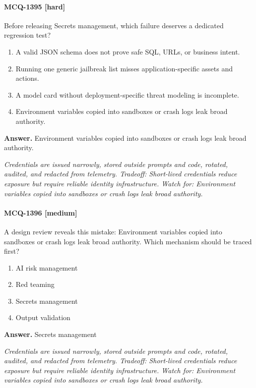 \paragraph{MCQ-1395 [hard]} Before releasing Secrets management, which failure deserves a dedicated regression test?
\begin{enumerate}[label=\Alph*.]
\item A valid JSON schema does not prove safe SQL, URLs, or business intent.
\item Running one generic jailbreak list misses application-specific assets and actions.
\item A model card without deployment-specific threat modeling is incomplete.
\item Environment variables copied into sandboxes or crash logs leak broad authority.
\end{enumerate}
\noindent\textbf{Answer.} Environment variables copied into sandboxes or crash logs leak broad authority.
\par\textit{Credentials are issued narrowly, stored outside prompts and code, rotated, audited, and redacted from telemetry. Tradeoff: Short-lived credentials reduce exposure but require reliable identity infrastructure. Watch for: Environment variables copied into sandboxes or crash logs leak broad authority.}
\paragraph{MCQ-1396 [medium]} A design review reveals this mistake: Environment variables copied into sandboxes or crash logs leak broad authority. Which mechanism should be traced first?
\begin{enumerate}[label=\Alph*.]
\item AI risk management
\item Red teaming
\item Secrets management
\item Output validation
\end{enumerate}
\noindent\textbf{Answer.} Secrets management
\par\textit{Credentials are issued narrowly, stored outside prompts and code, rotated, audited, and redacted from telemetry. Tradeoff: Short-lived credentials reduce exposure but require reliable identity infrastructure. Watch for: Environment variables copied into sandboxes or crash logs leak broad authority.}
